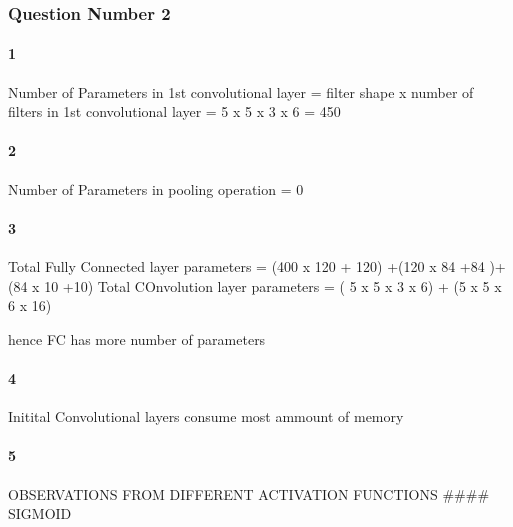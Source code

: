 \documentclass[11pt]{article}
\begin{document}
    \subsubsection{Question Number 2}\label{question-number-2}

    \paragraph{1}\label{section}

Number of Parameters in 1st convolutional layer = filter shape x number
of filters in 1st convolutional layer = 5 x 5 x 3 x 6 = 450

\paragraph{2}\label{section-1}

Number of Parameters in pooling operation = 0

\paragraph{3}\label{section-2}

Total Fully Connected layer parameters = (400 x 120 + 120) +(120 x 84
+84 )+ (84 x 10 +10) Total COnvolution layer parameters = ( 5 x 5 x 3 x
6) + (5 x 5 x 6 x 16)

hence FC has more number of parameters

\paragraph{4}\label{section-3}

Initital Convolutional layers consume most ammount of memory

\paragraph{5}\label{section-4}

OBSERVATIONS FROM DIFFERENT ACTIVATION FUNCTIONS \#\#\#\# SIGMOID
\end{document}
